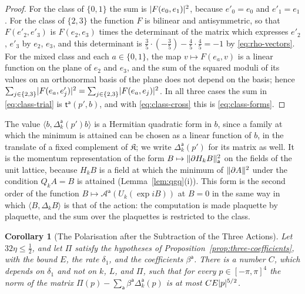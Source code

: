 \documentclass[11pt]{preprint}
\DeclarePairedDelimiter{\abs}{\lvert}{\rvert}
\DeclarePairedDelimiter{\norm}{\lVert}{\rVert}
\numberwithin{equation}{section}
\newtheorem{corollary}[theorem]{Corollary}
\theoremstyle{definition}
\theoremstyle{remark}
\theoremstyle{plain}
\begin{document}
\begin{proof}
For the class of $\{ 0, 1 \}$ the sum is $\abs{F(e_0, e_1)}^2$, because $e'_0 = e_0$ and $e'_1 = e_1$. For the class of $\{ 2, 3 \}$ the function $F$ is bilinear and antisymmetric, so that $F(e'_2, e'_3)$ is $F(e_2, e_3)$ times the determinant of the matrix which expresses $e'_2$, $e'_3$ by $e_2$, $e_3$, and this determinant is $\frac35 \cdot (-\frac35) - \frac45 \cdot \frac45 = -1$ by \eqref{eq:rho-vectors}. For the mixed class and each $a \in \{ 0, 1 \}$, the map $v \mapsto F(e_a, v)$ is a linear function on the plane of $e_2$ and $e_3$, and the sum of the squared moduli of its values on an orthonormal basis of the plane does not depend on the basis; hence $\sum_{j \in \{ 2, 3 \}}\abs{F(e_a, e'_j)}^2 = \sum_{j \in \{ 2, 3 \}}\abs{F(e_a, e_j)}^2$. In all three cases the sum in \eqref{eq:class-trial} is $\mathsf t^{\mathsf a}(p', b)$, and with \eqref{eq:class-cross} this is \eqref{eq:class-forms}.
\end{proof}

The value $\langle b, \Delta^{\mathsf a}_k(p')b\rangle$ is a Hermitian quadratic form in $b$, since a family at which the minimum is attained can be chosen as a linear function of $b$, in the translate of a fixed complement of $\mathfrak K$; we write $\Delta^{\mathsf a}_k(p')$ for its matrix as well. It is the momentum representation of the form $B \mapsto \norm{\partial H_kB}_{\mathsf a}^2$ on the fields of the unit lattice, because $H_kB$ is a field at which the minimum of $\norm{\partial A}^2$ under the condition $Q_kA = B$ is attained (Lemma~\ref{lem:qgq}(i)). This form is the second order of the function $B \mapsto \mathcal A^{\mathsf a}(U_k(\exp iB))$ at $B = 0$ in the same way in which $\langle B, \Delta_kB\rangle$ is that of the action: the computation \cite[(4.39), (4.40), p.~291]{BalabanRG1} is made plaquette by plaquette, and the sum over the plaquettes is restricted to the class.

\begin{corollary}[The Polarisation after the Subtraction of the Three Actions]\label{cor:renormalised-polarisation}
Let $32\eta \leq \frac12$, and let $\Pi$ satisfy the hypotheses of Proposition~\ref{prop:three-coefficients}, with the bound $E$, the rate $\delta_1$, and the coefficients $\beta^{\mathsf a}$. There is a number $C$, which depends on $\delta_1$ and not on $k$, $L$, and $\Pi$, such that for every $p \in [-\pi, \pi]^4$ the norm of the matrix $\Pi(p) - \sum_{\mathsf a}\beta^{\mathsf a}\Delta^{\mathsf a}_k(p)$ is at most $CE\abs p^{5/2}$.
\end{corollary}
\end{document}
